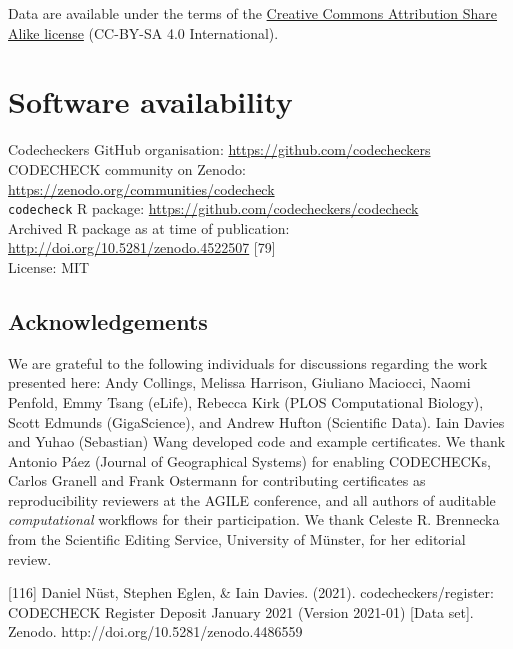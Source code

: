 \documentclass[12pt]{article}
\newcommand{\rev}[1]{\textit{#1}}
\begin{document}
Data are available under the terms of the \href{https://creativecommons.org/licenses/by-sa/4.0/legalcode}{Creative Commons Attribution Share Alike license} (CC-BY-SA 4.0 International).

\section*{Software availability}
Codecheckers GitHub organisation: \url{https://github.com/codecheckers}\\
CODECHECK community on Zenodo: \url{https://zenodo.org/communities/codecheck}\\

\texttt{codecheck} R package: \url{https://github.com/codecheckers/codecheck}\\
Archived R package as at time of publication: \url{http://doi.org/10.5281/zenodo.4522507} [79]\\
License: MIT

\subsection*{Acknowledgements}\label{acknowledgements}
We are grateful to the following individuals for discussions regarding
the work presented here: Andy Collings, Melissa Harrison, Giuliano
Maciocci, Naomi Penfold, Emmy Tsang (eLife), Rebecca Kirk (PLOS
Computational Biology), Scott Edmunds (GigaScience), and Andrew Hufton
(Scientific Data). Iain Davies and Yuhao (Sebastian) Wang developed
code and example certificates.  We thank Antonio P\'{a}ez (Journal of
Geographical Systems) for enabling CODECHECKs, Carlos Granell and
Frank Ostermann for contributing certificates as reproducibility
reviewers at the AGILE conference, and all authors of auditable
\rev{computational} workflows for their participation.  We thank Celeste R. Brennecka from
the Scientific Editing Service, University of M\"unster, for her
editorial review.



{\small
}
[116] Daniel Nüst, Stephen Eglen, \& Iain Davies. (2021). codecheckers/register: CODECHECK Register Deposit January 2021 (Version 2021-01) [Data set]. Zenodo. http://doi.org/10.5281/zenodo.4486559
\end{document}
